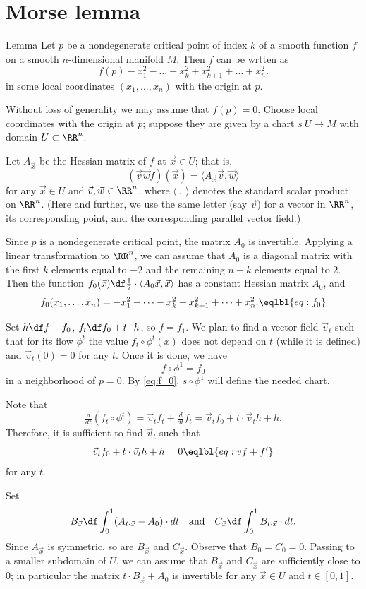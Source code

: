 \section{Morse lemma}

\begin{thm}{Lemma}
Let $p$ be a nondegenerate critical point of index $k$ of a smooth function $f$ on a smooth $n$-dimensional manifold $M$.
Then $f$ can be wrtten as
\[f(p)-x_1^2-\dots-x_k^2+x_{k+1}^2+\dots+x_n^2.\]
in some local coordinates $(x_1,\dots,x_n)$ with the origin at $p$.
\end{thm}

Without loss of generality we may assume that $f(p)=0$.
Choose local coordinates with the origin at $p$; suppose they are given by a chart $s\:U\to M$ with domain $U\subset\RR^n$.

Let $A_{\vec x}$ be the Hessian matrix of $f$ at ${\vec x}\in U$;
that is,
\[(\vec v\vec wf)(\vec x)=\langle A_{\vec x}\vec v,\vec w\rangle\]
for any $\vec x\in U$ and $\vec v,\vec w\in \RR^n$, where $\langle\ ,\ \rangle$ denotes the standard scalar product on $\RR^n$.
(Here and further, we use the same letter (say $\vec v$) for a vector in $\RR^n$, its corresponding point, and the corresponding parallel vector field.)

Since $p$ is a nondegenerate critical point, the matrix $A_0$ is invertible.
Applying a linear transformation to $\RR^n$, we can assume that $A_0$ is a diagonal matrix with the first $k$ elements equal to $-2$ and the remaining $n-k$ elements equal to $2$.
Then the function $f_0(\vec x)\df\tfrac12\cdot \langle A_{0}\vec x,\vec x\rangle$ has a constant Hessian matrix $A_0$, and
\[f_0(x_1,\dots,x_n)=-x_1^2-\dots-x_k^2+x_{k+1}^2+\dots+x_n^2.\eqlbl{eq:f_0}\]

Set $h\df f-f_0$,  $f_t\df f_0+t\cdot h$, so $f=f_1$.
We plan to find a vector field $\vec v_t$ such that for its flow $\phi^t$ the value $f_t\circ \phi^t(x)$ does not depend on $t$ (while it is defined) and $\vec v_t(0)=0$ for any $t$.
Once it is done, we have
\[f\circ\phi^1=f_0\]
in a neighborhood of $p=0$.
By \ref{eq:f_0}, $s\circ\phi^1$ will define the needed chart.

Note that
\[\tfrac d{dt}(f_t\circ \phi^t)=\vec v_tf_t+\tfrac{d}{dt}f_t=\vec v_tf_0+t\cdot\vec v_th +h.\]
Therefore, it is sufficient to find $\vec v_t$ such that
\[\vec v_tf_0+t\cdot\vec v_th +h=0\eqlbl{eq:vf+f'}\]
for any $t$.

Set
\[
B_{\vec x}\df\int_0^1(A_{t{\cdot}\vec x}-A_0)\cdot dt
\quad\text{and}\quad
C_{\vec x}\df\int_0^1B_{t{\cdot} {\vec x}}\cdot dt.
\]
Since $A_{\vec x}$ is symmetric, so are $B_{\vec x}$ and $C_{\vec x}$.
Observe that $B_0=C_0=0$.
Passing to a smaller subdomain of $U$, we can assume that $B_{\vec x}$ and $C_{\vec x}$ are sufficiently close to $0$;
in particular the matrix $t\cdot B_{\vec x}+A_{0}$ is invertible for any $\vec x\in U$ and $t\in[0,1]$.

